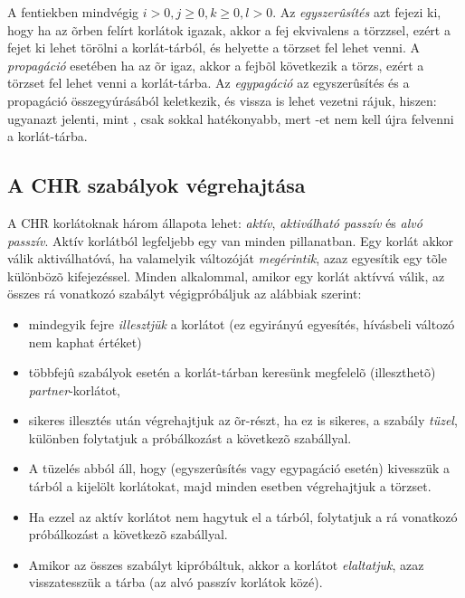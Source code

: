 A fentiekben mindvégig $i > 0, j \geq 0, k \geq 0, l > 0$.
\br
Az \emph{egyszerûsítés} azt fejezi ki, hogy ha az õrben felírt korlátok igazak, akkor
a fej ekvivalens a törzzsel, ezért a fejet ki lehet törölni a korlát-tárból, és helyette
a törzset fel lehet venni. A \emph{propagáció} esetében ha az õr igaz, akkor a fejbõl
következik a törzs, ezért a törzset fel lehet venni a korlát-tárba. Az \emph{egypagáció}
az egyszerûsítés és a propagáció összegyúrásából keletkezik, és vissza is lehet vezetni
rájuk, hiszen:  ugyanazt jelenti, mint
, csak sokkal hatékonyabb, mert -et
nem kell újra felvenni a korlát-tárba.

\subsection{A CHR szabályok végrehajtása}

A CHR korlátoknak három állapota lehet: \emph{aktív}, \emph{aktiválható passzív} és
\emph{alvó passzív}. Aktív korlátból legfeljebb egy van minden pillanatban. Egy
korlát akkor válik aktiválhatóvá, ha valamelyik változóját \emph{megérintik}, azaz
egyesítik egy tõle különbözõ kifejezéssel. Minden alkalommal, amikor egy korlát aktívvá
válik, az összes rá vonatkozó szabályt végigpróbáljuk az alábbiak szerint:

\begin{itemize}
\item mindegyik fejre \emph{illesztjük} a korlátot (ez egyirányú egyesítés,
hívásbeli változó nem kaphat értéket)
\item többfejû szabályok esetén a korlát-tárban keresünk megfelelõ
(illeszthetõ) \emph{partner}-korlátot,
\item sikeres illesztés után végrehajtjuk az õr-részt, ha ez is sikeres, a
szabály \emph{tüzel}, különben folytatjuk a próbálkozást a következõ szabállyal.
\item A tüzelés abból áll, hogy (egyszerûsítés vagy egypagáció esetén)
kivesszük a tárból a kijelölt korlátokat, majd minden esetben végrehajtjuk a törzset.
\item Ha ezzel az aktív korlátot nem hagytuk el a tárból, folytatjuk a rá vonatkozó
próbálkozást a következõ szabállyal.
\item Amikor az összes szabályt kipróbáltuk, akkor a korlátot \emph{elaltatjuk}, azaz
visszatesszük a tárba (az alvó passzív korlátok közé).
\end{itemize}

